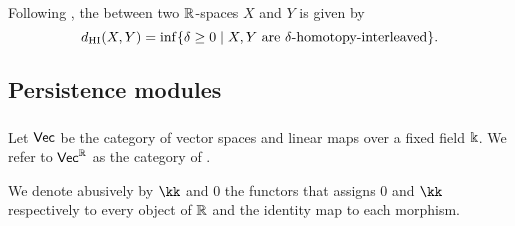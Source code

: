 Following \cite{blumberg2023interleaving}, the  between two $\R$-spaces $X$ and $Y$ is given by
\[
\dhi(X,Y) = \inf \set{\delta \geq 0 \mid X,Y \text{ are }\delta\text{-homotopy-interleaved}}.
\]

\subsection{Persistence modules}

\subsubsection{}

Let $\Vec$ be the category of vector spaces and linear maps over a fixed field $\k$.
We refer to $\Vec^\R$ as the category of .


We denote abusively by $\kk$ and $0$ the functors that assigns $0$ and $\kk$ respectively to every object of $\R$ and the identity map to each morphism.


\subsubsection{}

